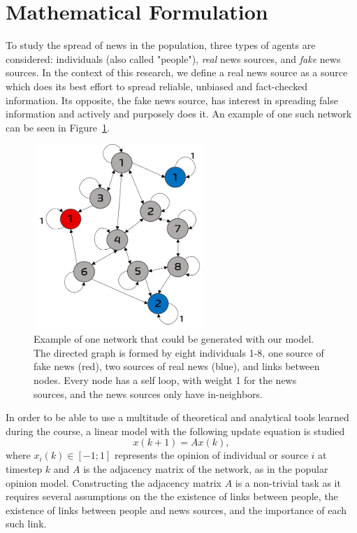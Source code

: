 \section{Mathematical Formulation}
\label{sec:mathematical}
To study the spread of news in the population, three types of agents are considered: individuals (also called "people"), \textit{real} news sources, and \textit{fake} news sources. In the context of this research, we define a real news source as a source which does its best effort to spread reliable, unbiased and fact-checked information. Its opposite, the fake news source, has interest in spreading false information and actively and purposely does it. An example of one such network can be seen in Figure~\ref{pics:network_example}.

\begin{figure}
\centering
\includegraphics[width=2.5in]{Figures/network_example.png}
\caption{Example of one network that could be generated with our model. The directed graph is formed by eight individuals 1-8, one source of fake news (red), two sources of real news (blue), and links between nodes. Every node has a self loop, with weight 1 for the news sources, and the news sources only have in-neighbors.}
\label{pics:network_example}
\end{figure}
In order to be able to use a multitude of theoretical and analytical tools learned during the course, a linear model with the following update equation is studied
\begin{equation}
\label{eq:model}
x(k+1) = A x(k),
\end{equation}
where $x_i(k) \in [-1;1]$ represents the opinion of individual or source  $i$ at timestep $k$ and $A$ is the adjacency matrix of the network, as in the popular opinion model\cite{Friedkin1990}.
Constructing the adjacency matrix $A$ is a non-trivial task as it requires several assumptions on the the existence of links between people, the existence of links between people and news sources, and the importance of each such link.
